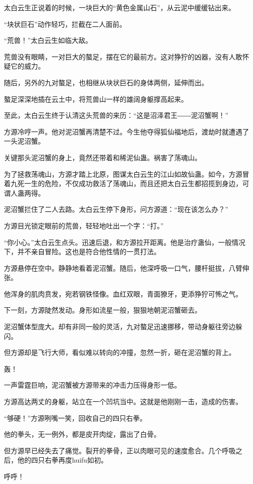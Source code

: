 \begin{this_body}
太白云生正说着的时候，一块巨大的“黄色金属山石”，从云泥中缓缓钻出来。

“块状巨石”动作轻巧，拦截在二人面前。

“荒兽！”太白云生如临大敌。

荒兽没有眼睛，一对巨大的螯足，摆在它的最前方。这对狰狞的凶器，没有人敢怀疑它的威力。

随后，另外的九对螯足，也相继从块状巨石的身体两侧，延伸而出。

螯足深深地插在云土中，将荒兽山一样的雄阔身躯撑高起来。

至此，太白云生终于认清这头荒兽的来历：“这是沼泽君王――泥沼蟹啊！”

方源冷哼一声。他对泥沼蟹再清楚不过。今生他夺得狐仙福地后，渡劫时就遭遇了一头泥沼蟹。

关键那头泥沼蟹的身上，竟然还带着和稀泥仙蛊。祸害了荡魂山。

为了拯救荡魂山，方源才踏上北原，图谋太白云生的江山如故仙蛊。如今，方源冒着九死一生的危险，不仅成功救活了荡魂山，而且还把太白云生都招揽到身边，可谓人蛊两得。

泥沼蟹拦住了二人去路。太白云生停下身形，问方源道：“现在该怎么办？”

方源目光锁定眼前的荒兽，轻轻地吐出一个字：“打。”

“你小心。”太白云生点头。迅速后退，和方源拉开距离。他是治疗蛊仙，一般情况下，并不亲自冒险。这也是符合他性情的一贯打法。

方源悬停在空中。静静地看着泥沼蟹。随后，他深呼吸一口气，腰杆挺拔，八臂伸张。

他浑身的肌肉贲发，宛若钢铁怪像。血红双眼，青面獠牙，更添狰狞可怖之气。

下一刻，方源陡然发动。身形如流星一般，狠狠地朝泥沼蟹砸去。

泥沼蟹体型庞大。却有非同一般的灵活，九对螯足迅速挪移，带动身躯往旁边躲闪。

但方源却是飞行大师，看似难以转向的冲撞，忽然一折，砸在泥沼蟹的背上。

轰！

一声雷霆巨响，泥沼蟹被方源带来的冲击力压得身形一低。

方源高达两丈的身躯，站立在一个凹坑当中。这就是他刚刚一击，造成的伤害。

“够硬！”方源咧嘴一笑，回收自己的四只右拳。

他的拳头，无一例外，都是皮开肉绽，露出了白骨。

但方源早已经失去了痛觉。裂开的拳骨，正以肉眼可见的速度愈合。几个呼吸之后，他的四只右拳再度huifu如初。

呼呼！


\end{this_body}
